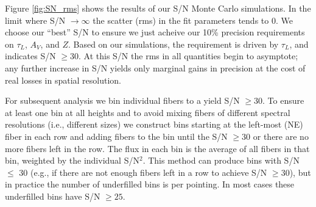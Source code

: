 %
% 
% 
% 
% 
% 
%  
%

Figure \ref{fig:SN_rms} shows the results of our S/N Monte Carlo
simulations. In the limit where S/N $\rightarrow\infty$ the scatter
(rms) in the fit parameters tends to 0.  We choose our ``best'' S/N to
ensure we just acheive our 10\% precision requirements on $\tau_L$,
$A_V$, and $Z$.  Based on our simulations, the requirement is driven
by $\tau_L$, and indicates S/N $\geq 30$.  At this S/N the rms in all
quantities begin to asymptote; any further increase in S/N yields only
marginal gains in precision at the cost of real losses in spatial
resolution.

For subsequent analysis we bin individual \GP fibers to a yield S/N
$\geq 30$. To ensure at least one bin at all heights and to avoid
mixing fibers of different spectral resolutions (i.e., different
sizes) we construct bins starting at the left-most (NE) fiber in each
row and adding fibers to the bin until the S/N $\geq 30$ or there are
no more fibers left in the row. The flux in each bin is the average of
all fibers in that bin, weighted by the individual S/N$^2$. This
method can produce bins with S/N $\leq$ 30 (e.g., if there are not
enough fibers left in a row to achieve S/N $\geq 30$), but in practice
the number of underfilled bins is  per pointing. In most cases
these underfilled bins have S/N $\geq 25$.

